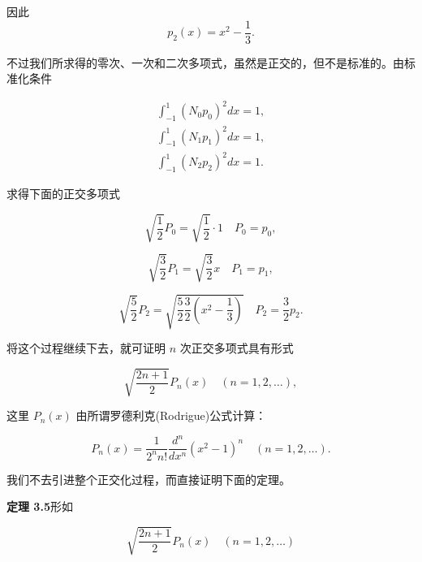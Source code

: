 因此
\begin{equation*}
p _ {2} (x) = x ^ {2} - \frac {1}{3}.
\end{equation*}

不过我们所求得的零次、一次和二次多项式，虽然是正交的，但不是标准的。由标准化条件

\begin{equation*}
\begin{array}{l} \int_ {- 1} ^ {1} (N _ {0} p _ {0}) ^ {2} d x = 1, \\ \int_ {- 1} ^ {1} (N _ {1} p _ {1}) ^ {2} d x = 1, \\ \int_ {- 1} ^ {1} (N _ {2} p _ {2}) ^ {2} d x = 1. \end{array}
\end{equation*}

求得下面的正交多项式

\begin{equation*}
\sqrt {\frac {1}{2}} P _ {0} = \sqrt {\frac {1}{2}} \cdot 1 \quad P _ {0} = p _ {0},
\end{equation*}

\begin{equation*}
\sqrt {\frac {3}{2}} P _ {1} = \sqrt {\frac {3}{2}} x \quad P _ {1} = p _ {1},
\end{equation*}

\begin{equation*}
\sqrt {\frac {5}{2}} P _ {2} = \sqrt {\frac {5}{2} \frac {3}{2} \left(x ^ {2} - \frac {1}{3}\right)} \quad P _ {2} = \frac {3}{2} p _ {2}.
\end{equation*}

将这个过程继续下去，就可证明 $n$ 次正交多项式具有形式

\begin{equation*}
\sqrt {\frac {2 n + 1}{2}} P _ {n} (x) \quad (n = 1, 2, \dots),
\end{equation*}

这里 $P_{n}(x)$ 由所谓罗德利克(Rodrigue)公式计算：

\begin{equation*}
P _ {n} (x) = \frac {1}{2 ^ {n} n !} \frac {d ^ {n}}{d x ^ {n}} (x ^ {2} - 1) ^ {n} \quad (n = 1, 2, \dots).\tag{3.75}
\end{equation*}

我们不去引进整个正交化过程，而直接证明下面的定理。

\textbf{定理 3.5}\quad 形如

\begin{equation*}
\sqrt {\frac {2 n + 1}{2}} P _ {n} (x) \quad (n = 1, 2, \dots)\tag{3.76}
\end{equation*}

